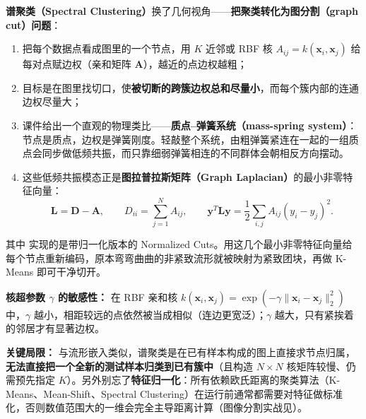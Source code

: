 \textbf{谱聚类（Spectral Clustering）}换了几何视角——\textbf{把聚类转化为图分割（graph cut）问题}：
\begin{enumerate}
\item 把每个数据点看成图里的一个节点，用 $K$ 近邻或 RBF 核 $A_{ij} = k(\mathbf{x}_i,\mathbf{x}_j)$ 给每对点赋边权（亲和矩阵 $\mathbf{A}$），越近的点边权越粗；
\item 目标是在图里找切口，使\textbf{被切断的跨簇边权总和尽量小}，而每个簇内部的连通边权尽量大；
\item 课件给出一个直观的物理类比——\textbf{质点–弹簧系统（mass-spring system）}：节点是质点，边权是弹簧刚度。轻敲整个系统，由粗弹簧紧连在一起的一组质点会同步做低频共振，而只靠细弱弹簧相连的不同群体会朝相反方向摆动。
\item 这些低频共振模态正是\textbf{图拉普拉斯矩阵（Graph Laplacian）}的最小非零特征向量：
\[
\mathbf{L} = \mathbf{D} - \mathbf{A}, \qquad D_{ii} = \sum_{j=1}^N A_{ij}, \qquad
\mathbf{y}^T \mathbf{L}\mathbf{y} = \frac{1}{2}\sum_{i,j} A_{ij}(y_i - y_j)^2.
\tag{9.9}
\]
\end{enumerate}
其中  实现的是带归一化版本的 Normalized Cuts。用这几个最小非零特征向量给每个节点重新编码，原本弯弯曲曲的非紧致流形就被映射为紧致团块，再做 K-Means 即可干净切开。

\textbf{核超参数 $\gamma$ 的敏感性：} 在 RBF 亲和核 $k(\mathbf{x}_i,\mathbf{x}_j) = \exp(-\gamma\|\mathbf{x}_i-\mathbf{x}_j\|_2^2)$ 中，$\gamma$ 越小，相距较远的点依然被当成相似（连边更宽泛）；$\gamma$ 越大，只有紧挨着的邻居才有显著边权。

\textbf{关键局限：} 与流形嵌入类似，谱聚类是在已有样本构成的图上直接求节点归属，\textbf{无法直接把一个全新的测试样本归类到已有簇中}（且构造 $N\times N$ 核矩阵较慢、仍需预先指定 $K$）。另外别忘了\textbf{特征归一化}：所有依赖欧氏距离的聚类算法（K-Means、Mean-Shift、Spectral Clustering）在运行前通常都需要对特征做标准化，否则数值范围大的一维会完全主导距离计算（图像分割实战见）。


